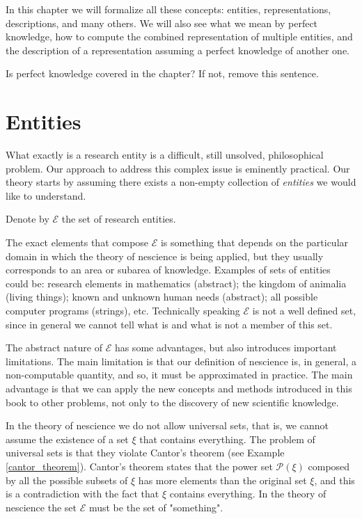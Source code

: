 In this chapter we will formalize all these concepts: entities, representations, descriptions, and many others. We will also see what we mean by perfect knowledge, how to compute the combined representation of multiple entities, and the description of a representation assuming a perfect knowledge of another one.

{\color{red} Is perfect knowledge covered in the chapter? If not, remove this sentence.}

%
%

\section{Entities}
\label{sec:descriptions_entities}

What exactly is a research entity is a difficult, still unsolved, philosophical problem. Our approach to address this complex issue is eminently practical. Our theory starts by assuming there exists a non-empty collection of \emph{entities} we would like to understand.

\begin{notation}
Denote by $\mathcal{E}$ the set of research entities.
\end{notation}

The exact elements that compose $\mathcal{E}$ is something that depends on the particular domain in which the theory of nescience is being applied, but they usually corresponds to an area or subarea of knowledge. Examples of sets of entities could be: research elements in mathematics (abstract); the kingdom of animalia (living things); known and unknown human needs (abstract); all possible computer programs (strings), etc. Technically speaking $\mathcal{E}$ is not a well defined set, since in general we cannot tell what is and what is not a member of this set.

The abstract nature of $\mathcal{E}$ has some advantages, but also introduces important limitations. The main limitation is that our definition of nescience is, in general, a non-computable quantity, and so, it must be approximated in practice. The main advantage is that we can apply the new concepts and methods introduced in this book to other problems, not only to the discovery of new scientific knowledge.

In the theory of nescience we do not allow universal sets, that is, we cannot assume the existence of a set $\xi$ that contains everything. The problem of universal sets is that they violate Cantor's theorem (see Example \ref{cantor_theorem}). Cantor's theorem states that the power set $\mathcal{P}(\xi)$ composed by all the possible subsets of $\xi$ has more elements than the original set $\xi$, and this is a contradiction with the fact that $\xi$ contains everything. In the theory of nescience the set $\mathcal{E}$ must be the set of "something".

